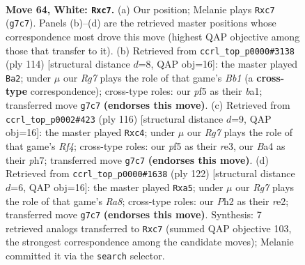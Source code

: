 \documentclass[11pt]{article}
\begin{document}
\clearpage

\begin{figure}[p]\centering
\begin{subfigure}{0.46\textwidth}\centering
\resizebox{\linewidth}{!}{%
\newchessgame
\chessboard[
  setfen={8/2p3R1/k7/5p2/B4P2/4K3/7P/8 w - - 1 64},
  showmover=false,
  pgfstyle=straightmove, color=movearrow, markmove={g7-c7}
]}
\caption{}
\end{subfigure}\hfill
\begin{subfigure}{0.46\textwidth}\centering
\resizebox{\linewidth}{!}{%
\newchessgame
\chessboard[
  setfen={8/4k2P/6p1/8/5PK1/8/8/bB6 w - - 1 58},
  showmover=false,
  pgfstyle=straightmove, color=movearrow, markmove={b1-a2}
]}
\caption{}
\end{subfigure}
\\[4pt]
\begin{subfigure}{0.46\textwidth}\centering
\resizebox{\linewidth}{!}{%
\newchessgame
\chessboard[
  setfen={8/7p/8/k6P/2p2R2/4r3/PK6/8 w - - 0 59},
  showmover=false,
  pgfstyle=straightmove, color=movearrow, markmove={f4-c4}
]}
\caption{}
\end{subfigure}\hfill
\begin{subfigure}{0.46\textwidth}\centering
\resizebox{\linewidth}{!}{%
\newchessgame
\chessboard[
  setfen={R7/8/8/p2p3k/3P4/2K5/4r3/8 w - - 0 62},
  showmover=false,
  pgfstyle=straightmove, color=movearrow, markmove={a8-a5}
]}
\caption{}
\end{subfigure}
\caption{\textbf{Move 64, White: \texttt{Rxc7}.} (a) Our position; Melanie plays \texttt{Rxc7} (\texttt{g7c7}). Panels (b)--(d) are the retrieved master positions whose correspondence most drove this move (highest QAP objective among those that transfer to it). (b) Retrieved from \texttt{ccrl\_top\_p0000\#3138} (ply 114) [structural distance $d$=8, QAP obj=16]: the master played \texttt{Ba2}; under $\mu$ our \emph{Rg7} plays the role of that game's \emph{Bb1} (a \textbf{cross-type} correspondence); cross-type roles: our \emph{p}f5 as their \emph{b}a1; transferred move \texttt{g7c7} \textbf{(endorses this move)}. (c) Retrieved from \texttt{ccrl\_top\_p0002\#423} (ply 116) [structural distance $d$=9, QAP obj=16]: the master played \texttt{Rxc4}; under $\mu$ our \emph{Rg7} plays the role of that game's \emph{Rf4}; cross-type roles: our \emph{p}f5 as their \emph{r}e3, our \emph{B}a4 as their \emph{p}h7; transferred move \texttt{g7c7} \textbf{(endorses this move)}. (d) Retrieved from \texttt{ccrl\_top\_p0000\#1638} (ply 122) [structural distance $d$=6, QAP obj=16]: the master played \texttt{Rxa5}; under $\mu$ our \emph{Rg7} plays the role of that game's \emph{Ra8}; cross-type roles: our \emph{P}h2 as their \emph{r}e2; transferred move \texttt{g7c7} \textbf{(endorses this move)}. Synthesis: 7 retrieved analogs transferred to \texttt{Rxc7} (summed QAP objective 103, the strongest correspondence among the candidate moves); Melanie committed it via the \texttt{search} selector.}
\label{fig:thought-m126}
\end{figure}
\end{document}
